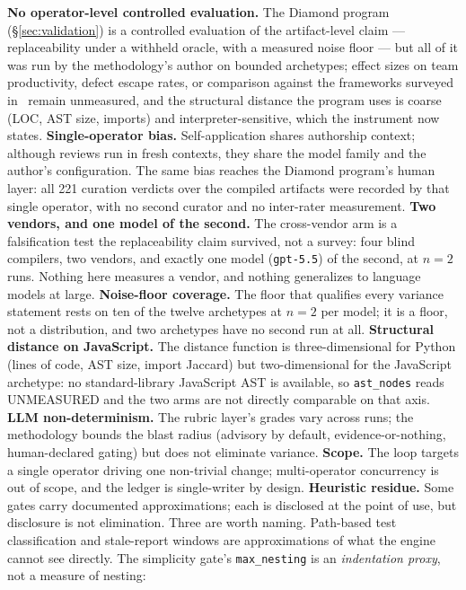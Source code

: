 \documentclass[11pt]{article}
\begin{document}
\textbf{No operator-level controlled evaluation.} The Diamond program
(\S\ref{sec:validation}) is a controlled evaluation of the artifact-level claim
--- replaceability under a withheld oracle, with a measured noise floor --- but all
of it was run by the methodology's author on bounded archetypes; effect sizes on team
productivity, defect escape rates, or comparison against the frameworks surveyed
in~\cite{demacedo2026prompt} remain unmeasured, and the structural distance the
program uses is coarse (LOC, AST size, imports) and interpreter-sensitive, which the
instrument now states.
\textbf{Single-operator bias.} Self-application shares authorship context;
although reviews run in fresh contexts, they share the model family and the
author's configuration. The same bias reaches the Diamond program's human
layer: all 221 curation verdicts over the compiled artifacts were recorded by
that single operator, with no second curator and no inter-rater measurement.
\textbf{Two vendors, and one model of the second.} The cross-vendor arm is a
falsification test the replaceability claim survived, not a survey: four blind
compilers, two vendors, and exactly one model (\texttt{gpt-5.5}) of the second,
at $n=2$ runs. Nothing here measures a vendor, and nothing generalizes to
language models at large.
\textbf{Noise-floor coverage.} The floor that qualifies every variance
statement rests on ten of the twelve archetypes at $n=2$ per model; it is a
floor, not a distribution, and two archetypes have no second run at all.
\textbf{Structural distance on JavaScript.} The distance function is
three-dimensional for Python (lines of code, AST size, import Jaccard) but
two-dimensional for the JavaScript archetype: no standard-library JavaScript
AST is available, so \texttt{ast\_nodes} reads UNMEASURED and the two arms are
not directly comparable on that axis.
\textbf{LLM non-determinism.} The rubric layer's grades vary across runs;
the methodology bounds the blast radius (advisory by default,
evidence-or-nothing, human-declared gating) but does not eliminate variance.
\textbf{Scope.} The loop targets a single operator driving one non-trivial
change; multi-operator concurrency is out of scope, and the ledger is
single-writer by design.
\textbf{Heuristic residue.} Some gates carry documented approximations; each is
disclosed at the point of use, but disclosure is not elimination. Three are worth
naming. Path-based test classification and stale-report windows are approximations
of what the engine cannot see directly. The simplicity gate's
\texttt{max\_nesting} is an \emph{indentation proxy}, not a measure of nesting:
\end{document}
